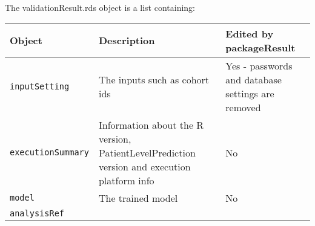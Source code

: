 \documentclass[
]{article}
\begin{document}
The validationResult.rds object is a list containing:

\begin{longtable}[]{@{}lll@{}}
\toprule
\begin{minipage}[b]{0.23\columnwidth}\raggedright
Object\strut
\end{minipage} & \begin{minipage}[b]{0.46\columnwidth}\raggedright
Description\strut
\end{minipage} & \begin{minipage}[b]{0.23\columnwidth}\raggedright
Edited by packageResult\strut
\end{minipage}\tabularnewline
\midrule
\endhead
\begin{minipage}[t]{0.23\columnwidth}\raggedright
\texttt{inputSetting}\strut
\end{minipage} & \begin{minipage}[t]{0.46\columnwidth}\raggedright
The inputs such as cohort ids\strut
\end{minipage} & \begin{minipage}[t]{0.23\columnwidth}\raggedright
Yes - passwords and database settings are removed\strut
\end{minipage}\tabularnewline
\begin{minipage}[t]{0.23\columnwidth}\raggedright
\texttt{executionSummary}\strut
\end{minipage} & \begin{minipage}[t]{0.46\columnwidth}\raggedright
Information about the R version, PatientLevelPrediction version and
execution platform info\strut
\end{minipage} & \begin{minipage}[t]{0.23\columnwidth}\raggedright
No\strut
\end{minipage}\tabularnewline
\begin{minipage}[t]{0.23\columnwidth}\raggedright
\texttt{model}\strut
\end{minipage} & \begin{minipage}[t]{0.46\columnwidth}\raggedright
The trained model\strut
\end{minipage} & \begin{minipage}[t]{0.23\columnwidth}\raggedright
No\strut
\end{minipage}\tabularnewline
\begin{minipage}[t]{0.23\columnwidth}\raggedright
\texttt{analysisRef}\strut
\end{minipage} & \begin{minipage}[t]{0.46\columnwidth}\raggedright

\end{minipage}
\end{longtable}
\end{document}
